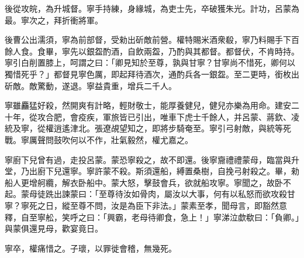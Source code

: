\begin{pinyinscope}
 
 
 
 後從攻皖，為升城督。寧手持練，身緣城，為吏士先，卒破獲朱光。計功，呂蒙為最。寧次之，拜折衝將軍。
 
 
後曹公出濡須，寧為前部督，受勑出斫敵前營。權特賜米酒衆殽，寧乃料賜手下百餘人食。食畢，寧先以銀盌酌酒，自飲兩盌，乃酌與其都督。都督伏，不肯時持。寧引白削置膝上，呵謂之曰：「卿見知於至尊，孰與甘寧？甘寧尚不惜死，卿何以獨惜死乎？」都督見寧色厲，即起拜待酒次，通酌兵各一銀盌。至二更時，銜枚出斫敵。敵驚動，遂退。寧益貴重，增兵二千人。
 
 
寧雖麤猛好殺，然開爽有計略，輕財敬士，能厚養健兒，健兒亦樂為用命。建安二十年，從攻合肥，會疫疾，軍旅皆已引出，唯車下虎士千餘人，并呂蒙、蔣欽、凌統及寧，從權逍遙津北。張遼覘望知之，即將步騎奄至。寧引弓射敵，與統等死戰。寧厲聲問鼓吹何以不作，壯氣毅然，權尤嘉之。
 
 
 
 
 寧廚下兒曾有過，走投呂蒙。蒙恐寧殺之，故不即還。後寧齎禮禮蒙母，臨當與升堂，乃出廚下兒還寧。寧許蒙不殺。斯須還船，縛置桑樹，自挽弓射殺之。畢，勑船人更增舸纜，解衣卧船中。蒙大怒，擊鼓會兵，欲就船攻寧。寧聞之，故卧不起。蒙母徒跣出諫蒙曰：「至尊待汝如骨肉，屬汝以大事，何有以私怒而欲攻殺甘寧？寧死之日，縱至尊不問，汝是為臣下非法。」蒙素至孝，聞母言，即豁然意釋，自至寧舩，笑呼之曰：「興霸，老母待卿食，急上！」寧涕泣歔欷曰：「負卿。」與蒙俱還見母，歡宴竟日。
 
 
 
 
 寧卒，權痛惜之。子瓌，以罪徙會稽，無幾死。
 
 
\end{pinyinscope}